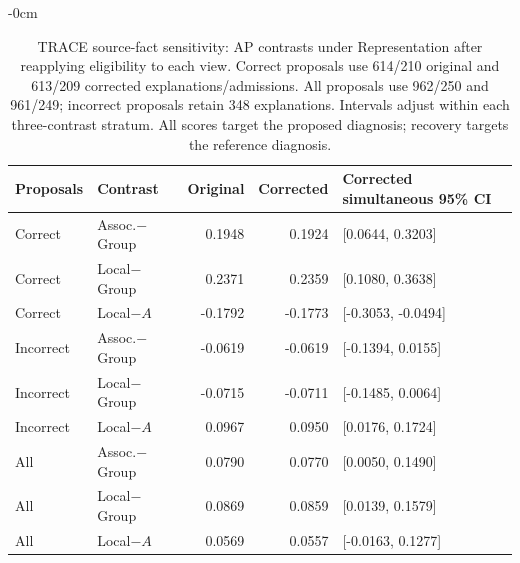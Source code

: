\begin{table}[!htbp]
\begin{adjustwidth}{-\extralength}{0cm}
\centering\footnotesize\setlength{\tabcolsep}{4pt}
\caption{TRACE source-fact sensitivity: AP contrasts under Representation after reapplying eligibility to each view. Correct proposals use 614/210 original and 613/209 corrected explanations/admissions. All proposals use 962/250 and 961/249; incorrect proposals retain 348 explanations. Intervals adjust within each three-contrast stratum. All scores target the proposed diagnosis; recovery targets the reference diagnosis.}\label{tab:source-correction-natural}
\begin{tabular}{llrrl}\toprule
Proposals & Contrast & Original & Corrected & Corrected simultaneous 95\% CI\\\midrule
Correct & Assoc.$-$Group & 0.1948 & 0.1924 & [0.0644, 0.3203] \\
Correct & Local$-$Group & 0.2371 & 0.2359 & [0.1080, 0.3638] \\
Correct & Local$-A$ & -0.1792 & -0.1773 & [-0.3053, -0.0494] \\
Incorrect & Assoc.$-$Group & -0.0619 & -0.0619 & [-0.1394, 0.0155] \\
Incorrect & Local$-$Group & -0.0715 & -0.0711 & [-0.1485, 0.0064] \\
Incorrect & Local$-A$ & 0.0967 & 0.0950 & [0.0176, 0.1724] \\
All & Assoc.$-$Group & 0.0790 & 0.0770 & [0.0050, 0.1490] \\
All & Local$-$Group & 0.0869 & 0.0859 & [0.0139, 0.1579] \\
All & Local$-A$ & 0.0569 & 0.0557 & [-0.0163, 0.1277] \\
\bottomrule\end{tabular}
\end{adjustwidth}
\end{table}
